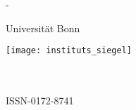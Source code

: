 

{\thispagestyle{empty}
\begin{addmargin}[\UBNcoveroffset]{-\UBNcoveroffset}
  \rmfamily\setlength{\parindent}{0pt}
  \begin{center}
    {\fontsize{44}{50}\selectfont
      Universität Bonn}

    \vspace*{20pt}

    \begin{singlespace}
      \fontsize{30}{40}\selectfont
      \InstituteName
    \end{singlespace}

    \vspace*{40pt}

    \begin{onehalfspace}
      \bfseries\huge
      \thesistitle
    \end{onehalfspace}

    \vspace*{20pt}

    {\LARGE
      \thesisauthor
    }
  \end{center}

  \vspace*{\fill}

  \thesisabstract

  \vspace*{\fill}

  {\normalfont\normalsize
    \parbox{0.3\textwidth}{\InstituteAddress}
    \hspace{\fill}
    \parbox{0.35\textwidth}{%
      \centering
      \texttt{[image: instituts\_siegel]}
    }
    \hspace{\fill}
    \parbox{0.3\textwidth}{%
      \thesisnumber\\
      \thesismonth{} \thesisyear\\
      ISSN-0172-8741
    }
  }
\end{addmargin}
}
